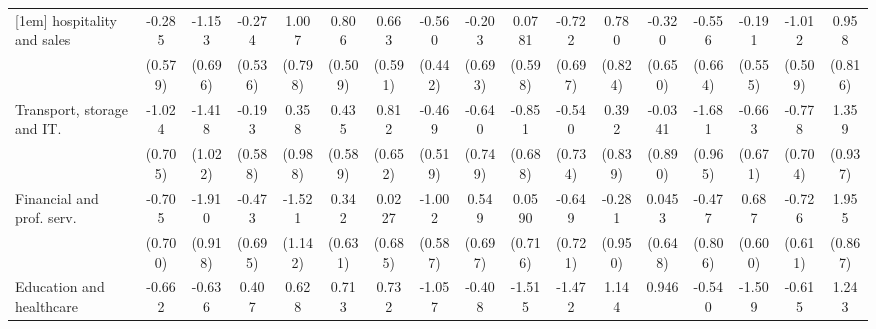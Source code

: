 {\begin{tabular}{l*{16}{c}}
[1em]
hospitality and sales&      -0.285         &      -1.153         &      -0.274         &       1.007         &       0.806         &       0.663         &      -0.560         &      -0.203         &      0.0781         &      -0.722         &       0.780         &      -0.320         &      -0.556         &      -0.191         &      -1.012\sym{*}  &       0.958         \\
                    &     (0.579)         &     (0.696)         &     (0.536)         &     (0.798)         &     (0.509)         &     (0.591)         &     (0.442)         &     (0.693)         &     (0.598)         &     (0.697)         &     (0.824)         &     (0.650)         &     (0.664)         &     (0.555)         &     (0.509)         &     (0.816)         \\
[1em]
Transport, storage and IT.&      -1.024         &      -1.418         &      -0.193         &       0.358         &       0.435         &       0.812         &      -0.469         &      -0.640         &      -0.851         &      -0.540         &       0.392         &     -0.0341         &      -1.681         &      -0.663         &      -0.778         &       1.359         \\
                    &     (0.705)         &     (1.022)         &     (0.588)         &     (0.988)         &     (0.589)         &     (0.652)         &     (0.519)         &     (0.749)         &     (0.688)         &     (0.734)         &     (0.839)         &     (0.890)         &     (0.965)         &     (0.671)         &     (0.704)         &     (0.937)         \\
[1em]
Financial and prof. serv.&      -0.705         &      -1.910\sym{*}  &      -0.473         &      -1.521         &       0.342         &      0.0227         &      -1.002         &       0.549         &      0.0590         &      -0.649         &      -0.281         &      0.0453         &      -0.477         &       0.687         &      -0.726         &       1.955\sym{*}  \\
                    &     (0.700)         &     (0.918)         &     (0.695)         &     (1.142)         &     (0.631)         &     (0.685)         &     (0.587)         &     (0.697)         &     (0.716)         &     (0.721)         &     (0.950)         &     (0.648)         &     (0.806)         &     (0.600)         &     (0.611)         &     (0.867)         \\
[1em]
Education and healthcare&      -0.662         &      -0.636         &       0.407         &       0.628         &       0.713         &       0.732         &      -1.057         &      -0.408         &      -1.515         &      -1.472         &       1.144         &       0.946         &      -0.540         &      -1.509         &      -0.615         &       1.243         \\

\end{tabular}}

